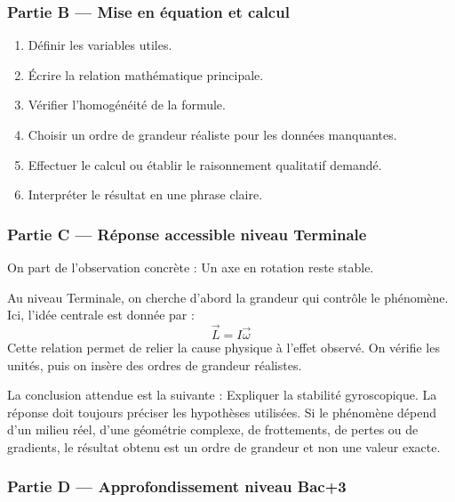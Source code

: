 \documentclass[11pt,a4paper]{article}
\begin{document}
\subsubsection*{Partie B — Mise en équation et calcul}

\begin{enumerate}
  \item Définir les variables utiles.
  \item Écrire la relation mathématique principale.
  \item Vérifier l'homogénéité de la formule.
  \item Choisir un ordre de grandeur réaliste pour les données manquantes.
  \item Effectuer le calcul ou établir le raisonnement qualitatif demandé.
  \item Interpréter le résultat en une phrase claire.
\end{enumerate}

\subsubsection*{Partie C — Réponse accessible niveau Terminale}

\begin{corrigebox}
On part de l'observation concrète : Un axe en rotation reste stable.

Au niveau Terminale, on cherche d'abord la grandeur qui contrôle le phénomène. Ici, l'idée centrale est donnée par :
\[
\vec L=I\vec\omega
\]
Cette relation permet de relier la cause physique à l'effet observé. On vérifie les unités, puis on insère des ordres de grandeur réalistes.

La conclusion attendue est la suivante : Expliquer la stabilité gyroscopique. La réponse doit toujours préciser les hypothèses utilisées. Si le phénomène dépend d'un milieu réel, d'une géométrie complexe, de frottements, de pertes ou de gradients, le résultat obtenu est un ordre de grandeur et non une valeur exacte.
\end{corrigebox}

\subsubsection*{Partie D — Approfondissement niveau Bac+3}
\end{document}
